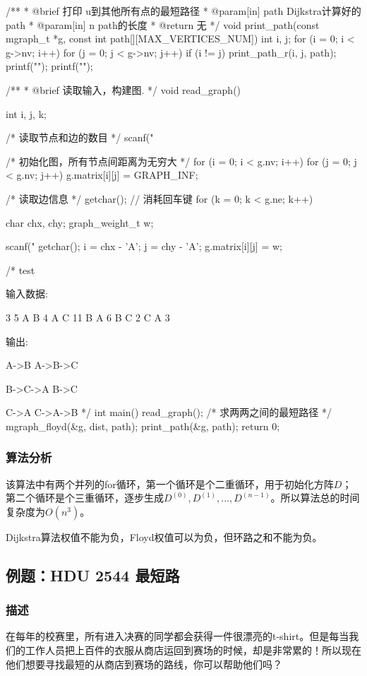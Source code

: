 \begin{Codex}[label=mgraph_floyd.c]
/**
 * @brief 打印 u到其他所有点的最短路径
 * @param[in] path Dijkstra计算好的path
 * @param[in] n path的长度
 * @return 无
 */
void print_path(const mgraph_t *g, const int path[][MAX_VERTICES_NUM]) {
    int i, j;
    for (i = 0; i < g->nv; i++) {
        for (j = 0; j < g->nv; j++) {
            if (i != j) {
                print_path_r(i, j, path);
                printf("\n");
            }
        }
        printf("\n");
    }
}

/**
 * @brief 读取输入，构建图.
 */
void read_graph() {
    int i, j, k;

    /* 读取节点和边的数目 */
    scanf("%

    /* 初始化图，所有节点间距离为无穷大 */
    for (i = 0; i < g.nv; i++) {
        for (j = 0; j < g.nv; j++) {
            g.matrix[i][j] = GRAPH_INF;
        }
    }

    /* 读取边信息 */
    getchar(); // 消耗回车键
    for (k = 0; k < g.ne; k++) {
        char chx, chy;
        graph_weight_t w;

        scanf("%
        getchar();
        i = chx - 'A';
        j = chy - 'A';
        g.matrix[i][j] = w;
    }
}

/* test

输入数据:

3 5
A B 4
A C 11
B A 6
B C 2
C A 3

输出:

A->B
A->B->C

B->C->A
B->C

C->A
C->A->B
*/
int main() {
    read_graph();
    /* 求两两之间的最短路径 */
    mgraph_floyd(&g, dist, path);
    print_path(&g, path);
    return 0;
}
\end{Codex}

\subsubsection{算法分析}
该算法中有两个并列的for循环，第一个循环是个二重循环，用于初始化方阵$D$；第二个循环是个三重循环，逐步生成$D^{(0)}, D^{(1)} ,...,D^{(n-1)}$。所以算法总的时间复杂度为$O(n^3)$。

Dijkstra算法权值不能为负，Floyd权值可以为负，但环路之和不能为负。


\subsection{例题：HDU 2544 最短路}
\subsubsection{描述}
在每年的校赛里，所有进入决赛的同学都会获得一件很漂亮的t-shirt。但是每当我们的工作人员把上百件的衣服从商店运回到赛场的时候，却是非常累的！所以现在他们想要寻找最短的从商店到赛场的路线，你可以帮助他们吗？

